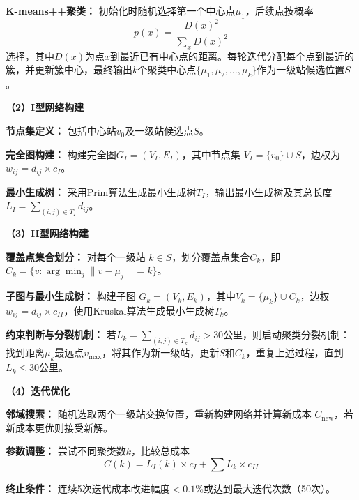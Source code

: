 \documentclass[12pt,a4paper]{article}
\begin{document}
\vspace{0.7em}
\textbf{K-means++聚类：} 初始化时随机选择第一个中心点$\mu_1$，后续点按概率
\[
  p(x) = \frac{D(x)^2}{\sum_x D(x)^2}
\]
选择，其中$D(x)$为点$x$到最近已有中心点的距离。每轮迭代分配每个点到最近的簇，并更新簇中心，最终输出$k$个聚类中心点$\{\mu_1, \mu_2, \dots, \mu_k\}$作为一级站候选位置$S$。

\vspace{1.2em}
\textbf{（2）I型网络构建}

\vspace{0.7em}
\textbf{节点集定义：} 包括中心站$v_0$及一级站候选点$S$。

\vspace{0.7em}
\textbf{完全图构建：} 构建完全图$G_I = (V_I, E_I)$，其中节点集 $V_I = \{v_0\} \cup S$，边权为 $w_{ij} = d_{ij} \times c_I$。

\vspace{0.7em}
\textbf{最小生成树：} 采用Prim算法生成最小生成树$T_I$，输出最小生成树及其总长度 $L_I = \sum_{(i,j) \in T_I} d_{ij}$。

\vspace{1.2em}
\textbf{（3）II型网络构建}

\vspace{0.7em}
\textbf{覆盖点集合划分：} 对每个一级站 $k \in S$，划分覆盖点集合$C_k$，即$C_k = \{v : \arg\min_j \|v - \mu_j\| = k\}$。

\vspace{0.7em}
\textbf{子图与最小生成树：} 构建子图 $G_k = (V_k, E_k)$，其中$V_k = \{\mu_k\} \cup C_k$，边权 $w_{ij} = d_{ij} \times c_{II}$，使用Kruskal算法生成最小生成树$T_k$。

\vspace{0.7em}
\textbf{约束判断与分裂机制：} 若$L_k = \sum_{(i,j) \in T_k} d_{ij} > 30$公里，则启动聚类分裂机制：找到距离$\mu_k$最远点$v_{\max}$，将其作为新一级站，更新$S$和$C_k$，重复上述过程，直到$L_k \leq 30$公里。

\vspace{1.2em}
\textbf{（4）迭代优化}

\vspace{0.7em}
\textbf{邻域搜索：} 随机选取两个一级站交换位置，重新构建网络并计算新成本 $C_{\text{new}}$，若新成本更优则接受新解。

\vspace{0.7em}
\textbf{参数调整：} 尝试不同聚类数$k$，比较总成本
\[
  C(k) = L_I(k) \times c_I + \sum L_k \times c_{II}
\]

\vspace{0.7em}
\textbf{终止条件：} 连续5次迭代成本改进幅度$<0.1\%$或达到最大迭代次数（50次）。
\end{document}
